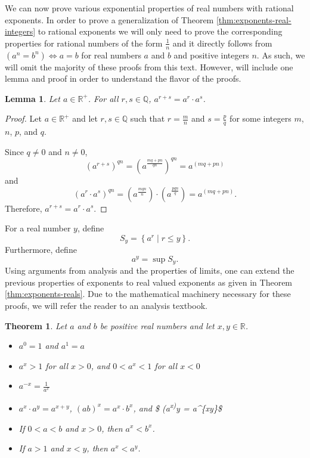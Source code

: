 \documentclass[
]{book}
\newtheorem{theorem}{Theorem}[chapter]
\newtheorem{lemma}{Lemma}[chapter]
\theoremstyle{definition}
\theoremstyle{definition}
\theoremstyle{definition}
\theoremstyle{remark}
\begin{document}
We can now prove various exponential properties of real numbers with rational exponents. In order to prove a generalization of Theorem \ref{thm:exponents-real-integers} to rational exponents we will only need to prove the corresponding properties for rational numbers of the form \(\frac{1}{n}\) and it directly follows from \((a^n=b^n) \Leftrightarrow a=b\) for real numbers \(a\) and \(b\) and positive integers \(n\). As such, we will omit the majority of these proofs from this text. However, will include one lemma and proof in order to understand the flavor of the proofs.

\begin{lemma}
\protect\hypertarget{lem:unnamed-chunk-121}{}{\label{lem:unnamed-chunk-121} }Let \(a\in \mathbb{R}^+\). For all \(r,s\in \mathbb{Q}\), \(a^{r+s}=a^r\cdot a^s\).
\end{lemma}

\begin{proof}
{}Let \(a\in \mathbb{R}^+\) and let \(r,s\in \mathbb{Q}\) such that \(r=\frac{m}{n}\) and \(s=\frac{p}{q}\) for some integers \(m\), \(n\), \(p\), and \(q\).

Since \(q\neq 0\) and \(n\neq 0\),
\[\left(a^{r+s}\right)^{qn} = \left( a^{\frac{mq+pn}{qn}}\right)^{qn} = a^{(mq+pn)}\] and
\[\left(a^r\cdot a^s\right)^{qn} = \left(a^{\frac{mqn}{n}}\right)\cdot \left(a^{\frac{pqn}{q}}\right) = a^{(mq+pn)}.\] Therefore, \(a^{r+s}=a^r\cdot a^s\).
\end{proof}

For a real number \(y\), define \[S_y= \left\{ a^r \middle \vert r \leq y\right\}.\] Furthermore, define \[a^y = \sup S_y.\] Using arguments from analysis and the properties of limits, one can extend the previous properties of exponents to real valued exponents as given in Theorem \ref{thm:exponents-reals}. Due to the mathematical machinery necessary for these proofs, we will refer the reader to an analysis textbook.

\begin{theorem}
\protect\hypertarget{thm:exponents-reals}{}{\label{thm:exponents-reals} }Let \(a\) and \(b\) be positive real numbers and let \(x,y\in \mathbb{R}\).

\begin{itemize}
\item
  \(a^0=1\) and \(a^1=a\)
\item
  \(a^x >1\) for all \(x>0\), and \(0<a^x<1\) for all \(x<0\)
\item
  \(a^{-x} = \frac{1}{a^x}\)
\item
  \(a^x\cdot a^y = a^{x+y}\), \((ab)^x=a^x\cdot b^x\), and \$ (a\textsuperscript{x)}y = a\^{}\{xy\}\$
\item
  If \(0<a<b\) and \(x>0\), then \(a^x<b^x\).
\item
  If \(a>1\) and \(x<y\), then \(a^x<a^y\).
\end{itemize}
\end{theorem}
\end{document}
